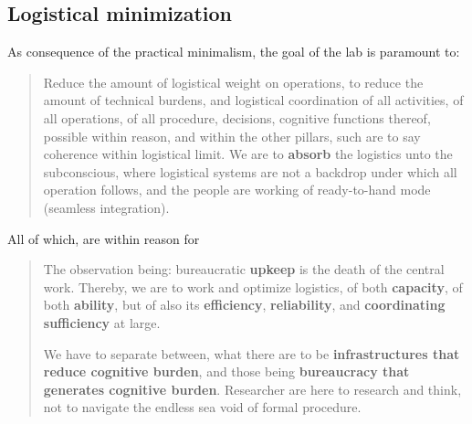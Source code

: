 \documentclass[10pt,a4paper]{article}
\begin{document}

\subsection{Logistical minimization}

As consequence of the practical minimalism, the goal of the lab is paramount to:

\begin{quote}
    Reduce the amount of logistical weight on operations, to reduce the amount of technical burdens, and logistical coordination of all activities, of all operations, of all procedure, decisions, cognitive functions thereof, possible within reason, and within the other pillars, such are to say coherence within logistical limit. We are to \textbf{absorb} the logistics unto the subconscious, where logistical systems are not a backdrop under which all operation follows, and the people are working of ready-to-hand mode (seamless integration). 
\end{quote}

All of which, are within reason for
\begin{quote}
    The observation being: bureaucratic \textbf{upkeep} is the death of the central work. Thereby, we are to work and optimize logistics, of both \textbf{capacity}, of both \textbf{ability}, but of also its \textbf{efficiency}, \textbf{reliability}, and \textbf{coordinating sufficiency} at large. 

    We have to separate between, what there are to be \textbf{infrastructures that reduce cognitive burden}, and those being \textbf{bureaucracy that generates cognitive burden}. Researcher are here to research and think, not to navigate the endless sea void of formal procedure. 
\end{quote}
\end{document}
